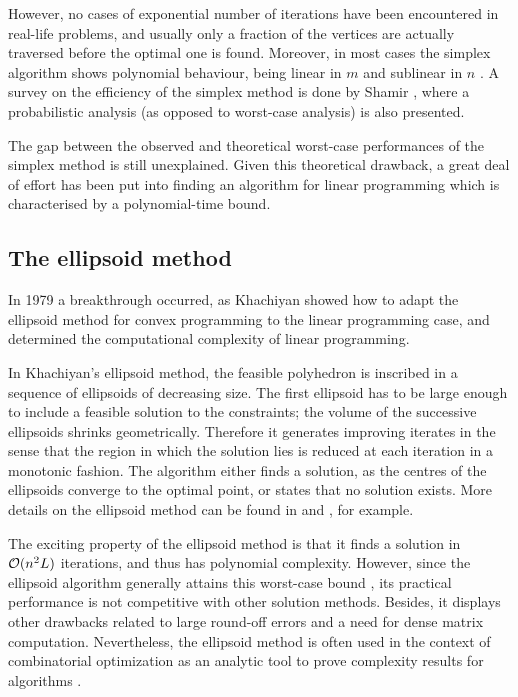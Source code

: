 However, no cases of exponential number of iterations have been encountered 
in real-life problems, and usually only a fraction of the vertices
are actually traversed before the optimal one is found.
Moreover, in most cases the simplex algorithm shows 
polynomial behaviour, being linear in $m$ and sublinear in $n$
\cite[p.94]{FangPuthenpura93}.
A survey on the efficiency of the simplex method is done by Shamir 
\cite{Shamir87}, where a probabilistic analysis (as opposed to
worst-case analysis) is also presented.

The gap between the observed and theoretical worst-case performances
of the simplex method is still unexplained.
Given this theoretical drawback, a great deal of effort 
has been put into finding an
algorithm for linear programming which is 
characterised by a polynomial-time bound.

%
%
\subsection{The ellipsoid method}

In 1979 a breakthrough occurred, as Khachiyan showed how to adapt 
the ellipsoid method for convex programming to the linear programming case,
and determined the computational complexity of linear programming.

In Khachiyan's ellipsoid method, the feasible polyhedron is inscribed in 
a sequence of ellipsoids of decreasing size. 
The first ellipsoid has to be large enough to include a feasible 
solution to the constraints; the volume of the successive ellipsoids 
shrinks geometrically. Therefore it generates improving iterates
in the sense that the region in which the solution lies is 
reduced at each iteration in a monotonic fashion.
The algorithm either finds a solution, as the centres of the ellipsoids
converge to the optimal point, or states that no solution exists.
More details on the ellipsoid method can be found in 
\cite[Chapter~13]{Schrijver86} and \cite[Chapter~I.6]{ip:NemhauserWolsey88},
for example.

The exciting property of the ellipsoid method is that it finds a 
solution in $\mathcal{O}(n^2L)$ iterations, and thus has polynomial complexity. 
However, since the ellipsoid algorithm generally attains
this worst-case bound \cite{GoldfarbTodd82},
its practical performance is not competitive
with other solution methods. Besides, it displays other drawbacks
related to large round-off errors and a need for dense matrix computation.
Nevertheless, the ellipsoid method is often used in the context of
combinatorial optimization as an analytic tool to prove complexity
results for algorithms \cite{ip:NemhauserWolsey88}.

